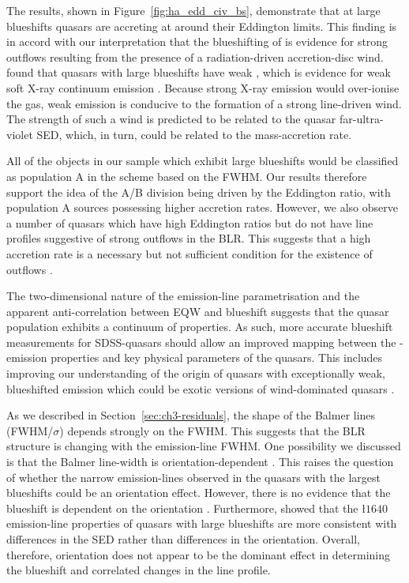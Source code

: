 The results, shown in Figure~\ref{fig:ha_edd_civ_bs}, demonstrate that at large blueshifts quasars are accreting at around their Eddington limits.
This finding is in accord with our interpretation that the blueshifting of  is evidence for strong outflows resulting from the presence of a radiation-driven accretion-disc wind.
\citet{richards02} found that quasars with large  blueshifts have weak , which is evidence for weak soft X-ray continuum emission \citep{leighly04}.
Because strong X-ray emission would over-ionise the gas, weak emission is conducive to the formation of a strong line-driven wind.
The strength of such a wind is predicted to be related to the quasar far-ultra-violet SED, which, in turn, could be related to the mass-accretion rate.

All of the objects in our sample which exhibit large  blueshifts would be classified as population A in the \citet{sulentic00b} scheme based on the \ha FWHM.
Our results therefore support the idea of the \citet{sulentic00b} A/B division being driven by the Eddington ratio, with population A sources possessing higher accretion rates.
However, we also observe a number of quasars which have high Eddington ratios but do not have line profiles suggestive of strong outflows in the  BLR.
This suggests that a high accretion rate is a necessary but not sufficient condition for the existence of outflows \citep{baskin05}.

The two-dimensional nature of the  emission-line parametrisation and the apparent anti-correlation between  EQW and  blueshift suggests that the quasar population exhibits a continuum of properties.
As such, more accurate  blueshift measurements for SDSS-quasars should allow an improved mapping between the -emission properties and key physical parameters of the quasars.
This includes improving our understanding of the origin of quasars with exceptionally weak, blueshifted  emission \citep[weak emission-line quasars;][]{luo15} which could be exotic versions of wind-dominated quasars \citep{plotkin15}.

As we described in Section~\ref{sec:ch3-residuals}, the shape of the Balmer lines (FWHM/$\sigma$) depends strongly on the FWHM.
This suggests that the BLR structure is changing with the emission-line FWHM.
One possibility we discussed is that the Balmer line-width is orientation-dependent \citep[e.g.][]{shen14}.
This raises the question of whether the narrow \ha emission-lines observed in the quasars with the largest  blueshifts could be an orientation effect.
However, there is no evidence that the  blueshift is dependent on the orientation \citep[inferred from the radio core-dominance;][]{richards11,runnoe14}.
Furthermore, \citet{leighly04} showed that the \l$1640$ emission-line properties of quasars with large  blueshifts are more consistent with differences in the SED rather than differences in the orientation.
Overall, therefore, orientation does not appear to be the dominant effect in determining the  blueshift and correlated changes in the \ha line profile.

